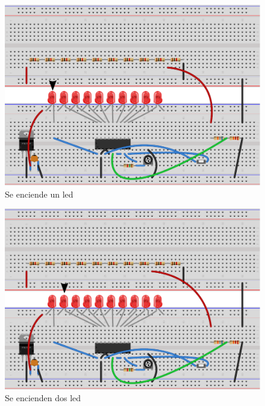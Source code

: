\documentclass[12pt,a4paper]{article}
\begin{document}
			\begin{figure}[H]
			\centering
				\includegraphics[scale=0.9]{images/labo1_bb2.pdf}\caption{Se enciende un led}
			\end{figure}

			\begin{figure}[H]
			\centering
				\includegraphics[scale=0.9]{images/labo1_bb1.pdf}\caption{Se encienden dos led}
			\end{figure}
\end{document}
